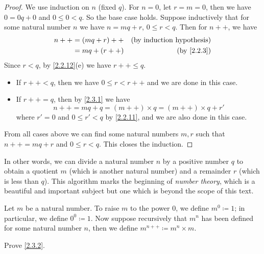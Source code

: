 \begin{proof}
  We use induction on \(n\) (fixed \(q\)).
  For \(n = 0\), let \(r = m = 0\), then we have \(0 = 0q + 0\) and \(0 \leq 0 < q\).
  So the base case holds.
  Suppose inductively that for some natural number \(n\) we have \(n = mq + r\), \(0 \leq r < q\).
  Then for \(n++\), we have
  \begin{align*}
    n++ & = (mq + r)++ & \text{(by induction hypothesis)} \\
        & = mq + (r++) & \text{(by \cref{2.2.3})}         \\
  \end{align*}
  Since \(r < q\), by \cref{2.2.12}(e) we have \(r++ \leq q\).
  \begin{itemize}
    \item If \(r++ < q\), then we have \(0 \leq r < r++\) and we are done in this case.
    \item If \(r++ = q\), then by \cref{2.3.1} we have
          \[
            n++ = mq + q = (m++) \times q = (m++) \times q + r'
          \]
          where \(r' = 0\) and \(0 \leq r' < q\) by \cref{2.2.11}, and we are also done in this case.
  \end{itemize}
  From all cases above we can find some natural numbers \(m, r\) such that \(n++ = mq + r\) and \(0 \leq r < q\).
  This closes the induction.
\end{proof}

\begin{remark}\label{2.3.10}
  In other words, we can divide a natural number \(n\) by a positive number \(q\) to obtain a quotient \(m\) (which is another natural number) and a remainder \(r\) (which is less than \(q\)).
  This algorithm marks the beginning of \emph{number theory}, which is a beautiful and important subject but one which is beyond the scope of this text.
\end{remark}

\begin{definition}\label{2.3.11}
  Let \(m\) be a natural number.
  To raise \(m\) to the power \(0\), we define \(m^0 \coloneqq 1\); in particular, we define \(0^0 \coloneqq 1\).
  Now suppose recursively that \(m^n\) has been defined for some natural number \(n\), then we define \(m^{n++} \coloneqq m^n \times m\).
\end{definition}

\exercisesection

\begin{exercise}\label{ex 2.3.1}
  Prove \cref{2.3.2}.
\end{exercise}

